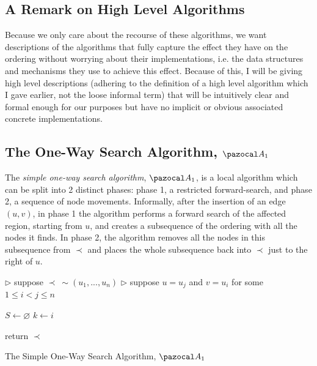 \documentclass{report}
\begin{document}
\subsection{A Remark on High Level Algorithms}

Because we only care about the recourse of these algorithms, we want descriptions of the algorithms that fully capture the effect they have on the ordering without worrying about their implementations, i.e. the data structures and mechanisms they use to achieve this effect. Because of this, I will be giving high level descriptions (adhering to the definition of a high level algorithm which I gave earlier, not the loose informal term) that will be intuitively clear and formal enough for our purposes but have no implicit or obvious associated concrete implementations.

\subsection{The One-Way Search Algorithm, $\pazocal A_1$}

The \textit{simple one-way search algorithm}, $\pazocal A_1$, is a local algorithm which can be split into 2 distinct phases: phase 1, a restricted forward-search, and phase 2, a sequence of node movements. Informally, after the insertion of an edge $(u,v)$, in phase 1 the algorithm performs a forward search of the affected region, starting from $u$, and creates a subsequence of the ordering with all the nodes it finds. In phase 2, the algorithm removes all the nodes in this subsequence from $\prec$ and places the whole subsequence back into $\prec$ just to the right of $u$.\newline

\begin{algorithm}[H]\label{oneway}
    \SetAlgoLined
    
    
    $\triangleright$ suppose $\prec \: \sim (u_1,...,u_n)$\;
    $\triangleright$ suppose $u = u_j$ and $v=u_i$ for some $1 \leq i < j \leq n$\;
    
    $S \leftarrow \varnothing$\;
    $k \leftarrow i$\;
    
    
    return $\prec$\;
    \caption{The Simple One-Way Search Algorithm, $\pazocal A_1$}
\end{algorithm}
\end{document}
